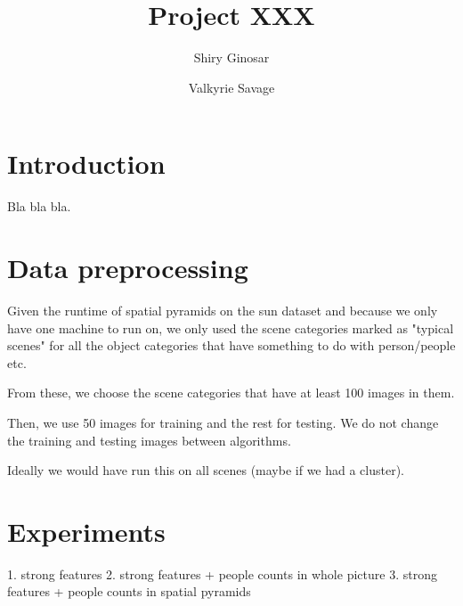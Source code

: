 \documentclass[11pt]{article}
\begin{document}
\title{Project XXX}
\author{Shiry Ginosar \and Valkyrie Savage}

\maketitle


\section{Introduction}
Bla bla bla.

\section{Data preprocessing}
Given the runtime of spatial pyramids on the sun dataset and because we only have one machine to run on, we only used the scene categories marked as "typical scenes" for all the object categories that have something to do with person/people etc.

From these, we choose the scene categories that have at least 100 images in them.

Then, we use 50 images for training and the rest for testing. We do not change the training and testing images between algorithms.

Ideally we would have run this on all scenes (maybe if we had a cluster).

\section{Experiments}
1. strong features
2. strong features + people counts in whole picture
3. strong features + people counts in spatial pyramids



\end{document}
